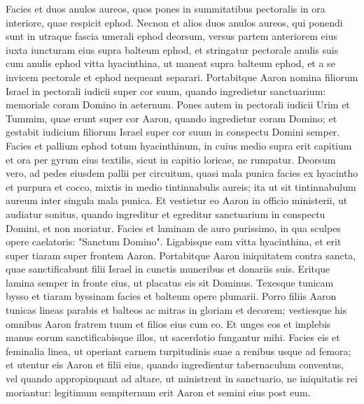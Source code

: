 \begin{biblechapter}
\verse Facies et duos anulos aureos, quos pones in summitatibus pectoralis in ora interiore, quae respicit ephod. 
\verse Necnon et alios duos anulos aureos, qui ponendi sunt in utraque fascia umerali ephod deorsum, versus partem anteriorem eius iuxta iuncturam eius supra balteum ephod, 
\verse et stringatur pectorale anulis suis cum anulis ephod vitta hyacinthina, ut maneat supra balteum ephod, et a se invicem pectorale et ephod nequeant separari. 
\verse Portabitque Aaron nomina filiorum Israel in pectorali iudicii super cor suum, quando ingredietur sanctuarium: memoriale coram Domino in aeternum. 
\verse Pones autem in pectorali iudicii Urim et Tummim, quae erunt super cor Aaron, quando ingredietur coram Domino; et gestabit iudicium filiorum Israel super cor suum in conspectu Domini semper. 
\verse Facies et pallium ephod totum hyacinthinum, 
\verse in cuius medio supra erit capitium et ora per gyrum eius textilis, sicut in capitio loricae, ne rumpatur. 
\verse Deorsum vero, ad pedes eiusdem pallii per circuitum, quasi mala punica facies ex hyacintho et purpura et cocco, mixtis in medio tintinnabulis aureis;  
\verse ita ut sit tintinnabulum aureum inter singula mala punica. 
\verse Et vestietur eo Aaron in officio ministerii, ut audiatur sonitus, quando ingreditur et egreditur sanctuarium in conspectu Domini, et non moriatur. 
\verse Facies et laminam de auro purissimo, in qua sculpes opere caelatoris: "Sanctum Domino". 
\verse Ligabisque eam vitta hyacinthina, et erit super tiaram  
\verse super frontem Aaron. Portabitque Aaron iniquitatem contra sancta, quae sanctificabunt filii Israel in cunctis muneribus et donariis suis. Eritque lamina semper in fronte eius, ut placatus eis sit Dominus. 
\verse Texesque tunicam bysso et tiaram byssinam facies et balteum opere plumarii. 
\verse Porro filiis Aaron tunicas lineas parabis et balteos ac mitras in gloriam et decorem; 
\verse vestiesque his omnibus Aaron fratrem tuum et filios eius cum eo. Et unges eos et implebis manus eorum sanctificabisque illos, ut sacerdotio fungantur mihi. 
\verse Facies eis et feminalia linea, ut operiant carnem turpitudinis suae a renibus usque ad femora; 
\verse et utentur eis Aaron et filii eius, quando ingredientur tabernaculum conventus, vel quando appropinquant ad altare, ut ministrent in sanctuario, ne iniquitatis rei moriantur: legitimum sempiternum erit Aaron et semini eius post eum. 
\end{biblechapter}

